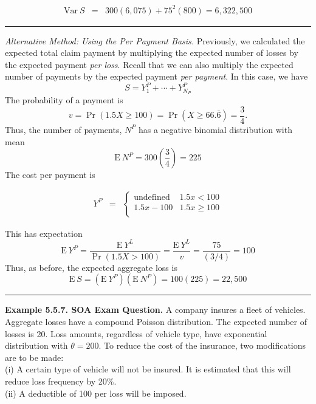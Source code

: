 \documentclass[]{book}
\theoremstyle{definition}
\theoremstyle{definition}
\theoremstyle{definition}
\theoremstyle{remark}
\begin{document}
\begin{eqnarray*}
\mathrm{Var~}S &=& 300(6,075) + 75^2 (800) = 6,322,500
\end{eqnarray*}

\begin{center}\rule{0.5\linewidth}{\linethickness}\end{center}

\emph{Alternative Method: Using the Per Payment Basis.} Previously, we
calculated the expected total claim payment by multiplying the expected
number of losses by the expected payment \emph{per loss}. Recall that we
can also multiply the expected number of payments by the expected
payment \emph{per payment}. In this case, we have
\[S=Y_1^P + \cdots + Y_{N_P}^P \] The probability of a payment is
\[v=\Pr(1.5X \ge 100)=\Pr(X \ge 66.\bar{6})=\frac{3}{4} .\] Thus, the
number of payments, \(N^P\) has a negative binomial distribution with
mean \[\mathrm{E~}N^P=300 \left(\frac{3}{4} \right)=225\] The cost per
payment is

\begin{eqnarray*}
Y^P &=&
\left\{
\begin{array}{cc}
\text{undefined} & 1.5x<100 \\
1.5x-100 & 1.5x\ge 100\\
\end{array}
\right.
\end{eqnarray*}

This has expectation
\[\mathrm{E~}Y^P=\frac{\mathrm{E~}Y^L}{\Pr(1.5X > 100)}=
\frac{\mathrm{E~}Y^L}{v}=\frac{75}{(3/4)}=100\] Thus, as before, the
expected aggregate loss is
\[\mathrm{E~}S=\left(\mathrm{E~}Y^P\right) \left(\mathrm{E~}N^P\right) =
100(225)=22,500\]

\begin{center}\rule{0.5\linewidth}{\linethickness}\end{center}

\textbf{Example 5.5.7. SOA Exam Question.} A company insures a fleet of
vehicles. Aggregate losses have a compound Poisson distribution. The
expected number of losses is 20. Loss amounts, regardless of vehicle
type, have exponential distribution with \(\theta=200\). To reduce the
cost of the insurance, two modifications are to be made:\\
(i) A certain type of vehicle will not be insured. It is estimated that
this will reduce loss frequency by 20\(\%\).\\
(ii) A deductible of 100 per loss will be imposed.
\end{document}
